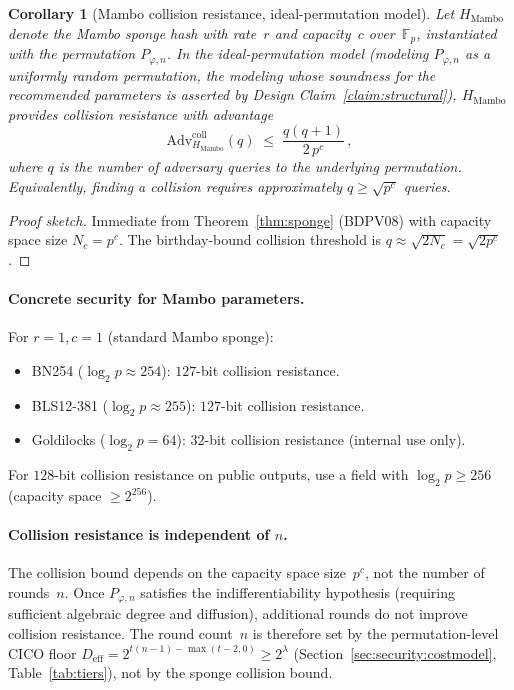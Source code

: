\documentclass[11pt,a4paper]{article}
\newtheorem{corollary}[theorem]{Corollary}
\theoremstyle{definition}
\newcommand{\F}{\mathbb{F}}
\begin{document}
\begin{corollary}[Mambo collision resistance, ideal-permutation model]\label{thm:collision}
Let $H_{\mathrm{Mambo}}$ denote the Mambo sponge hash with rate~$r$ and
capacity~$c$ over~$\F_p$, instantiated with the permutation $P_{\varphi,n}$.
In the ideal-permutation model (modeling $P_{\varphi,n}$ as a uniformly
random permutation, the modeling whose soundness for the recommended
parameters is asserted by Design Claim~\ref{claim:structural}),
$H_{\mathrm{Mambo}}$ provides collision
resistance with advantage
\[
  \mathrm{Adv}^{\mathrm{coll}}_{H_{\mathrm{Mambo}}}(q)
  \;\le\; \frac{q(q+1)}{2\,p^c}\,,
\]
where $q$ is the number of adversary queries to the underlying permutation.
Equivalently, finding a collision requires approximately
$q \ge \sqrt{p^c}$ queries.
\end{corollary}

\begin{proof}[Proof sketch]
Immediate from Theorem~\ref{thm:sponge} (BDPV08) with capacity space
size $N_c = p^c$. The birthday-bound collision threshold
is $q \approx \sqrt{2 N_c} = \sqrt{2 p^c}$.
\end{proof}

\paragraph{Concrete security for Mambo parameters.}
For $r=1, c=1$ (standard Mambo sponge):
\begin{itemize}[nosep]
  \item BN254 ($\log_2 p \approx 254$): $127$-bit collision resistance.
  \item BLS12-381 ($\log_2 p \approx 255$): $127$-bit collision resistance.
  \item Goldilocks ($\log_2 p = 64$): $32$-bit collision resistance
        (internal use only).
\end{itemize}
For $128$-bit collision resistance on public outputs, use a field with
$\log_2 p \ge 256$ (capacity space $\ge 2^{256}$).

\paragraph{Collision resistance is independent of $n$.}
The collision bound depends on the capacity space size~$p^c$, not the
number of rounds~$n$. Once $P_{\varphi,n}$ satisfies the
indifferentiability hypothesis (requiring sufficient algebraic degree and
diffusion), additional rounds do not improve collision resistance. The
round count~$n$ is therefore set by the permutation-level CICO floor
$D_{\mathrm{eff}} = 2^{t(n-1)-\max(t-2,0)} \ge 2^{\lambda}$
(Section~\ref{sec:security:costmodel}, Table~\ref{tab:tiers}), not by
the sponge collision bound.
\end{document}
